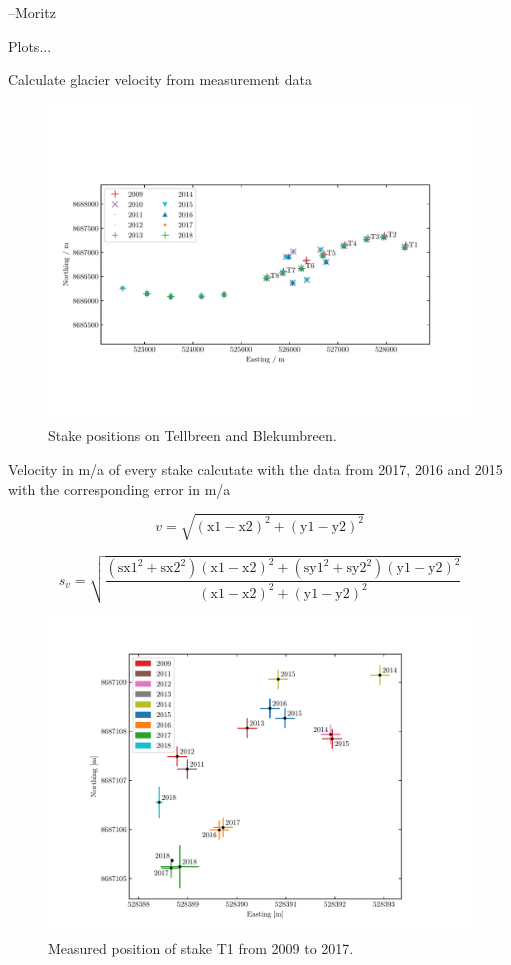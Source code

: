 --Moritz


Plots...

Calculate glacier velocity from measurement data

\begin{figure}[H]
    \centering
    \includegraphics[width=\textwidth]{../fig/stakePositions.pdf}
    \caption{Stake positions on Tellbreen and Blekumbreen.}
    \label{GF:fig:stakepos}
\end{figure}

\begin{table}[h]
	\caption{Velocity in m/a of every stake calcutate with the data from 2017, 2016 and 2015 with the corresponding error in m/a}
	\centering
	\scriptsize
	
	\label{GPS:tab:os_tab}
\end{table}

\begin{equation}
v = \sqrt{(\text{x1}-\text{x2})^2+(\text{y1}-\text{y2})^2}
\end{equation}

\begin{equation}
s_v = 
\sqrt{\frac
{\left(\text{sx1}^2+\text{sx2}^2\right)(\text{x1}-\text{x2})^2+
\left(\text{sy1}^2+\text{sy2}^2\right)(\text{y1}-\text{y2})^2}
{(\text{x1}-\text{x2})^2+(\text{y1}-\text{y2})^2}}
\end{equation}


\begin{figure}[H]
    \centering
    \includegraphics[width=\textwidth]{../fig/T1_2d.pdf}
    \caption{Measured position of stake T1 from 2009 to 2017.}
    \label{GF:fig:T1_2d}
\end{figure}
